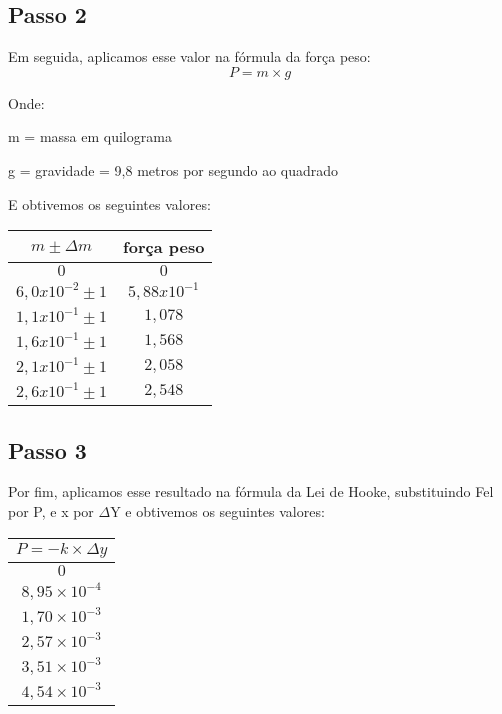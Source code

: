 \documentclass[a4paper, 12pt]{article}
\begin{document}
\subsection{Passo 2}
Em seguida, aplicamos esse valor na fórmula da força peso:
\begin{equation}
    P = m \times g
\end{equation}

Onde:

m = massa em quilograma \vspace{1} 

g = gravidade = 9,8 metros por segundo ao quadrado \vspace{1}

E obtivemos os seguintes valores: \vspace{1}


\begin{table}[!ht]
    \centering
    \begin{tabular}{|c|c|}
    \hline
        $m \pm \Delta m$ & força peso \\ \hline
        $0$ & $0$ \\ \hline
        $6,0 x 10 ^ {-2} \pm 1$ & $5,88 x 10 ^ {-1}$  \\ \hline
        $1,1 x 10 ^ {-1} \pm 1$ & $1,078$ \\ \hline
        $1,6 x 10 ^ {-1} \pm 1$ & $1,568$ \\ \hline
        $2,1 x 10 ^ {-1} \pm 1$ & $2,058$ \\ \hline
        $2,6 x 10 ^ {-1} \pm 1$ & $2,548$ \\ \hline 
    \end{tabular}
\end{table}

\subsection{Passo 3}
Por fim, aplicamos esse resultado na fórmula da Lei de Hooke, substituindo Fel por P, e x por $\Delta$Y e obtivemos os seguintes valores:

\begin{table}[ht]
\centering
\begin{tabular}{|c|}
\hline
    $P = -k \times \Delta y$ \\ \hline
    $0  $                    \\ \hline
    $8,95 \times 10 ^ {-4}$  \\ \hline
    $1,70 \times 10 ^ {-3}$  \\ \hline 
    $2,57 \times 10 ^ {-3}$  \\ \hline
    $3,51 \times 10 ^ {-3}$  \\ \hline
    $4,54 \times 10 ^ {-3}$  \\ \hline
  \end{tabular}
\end{table}
\end{document}
